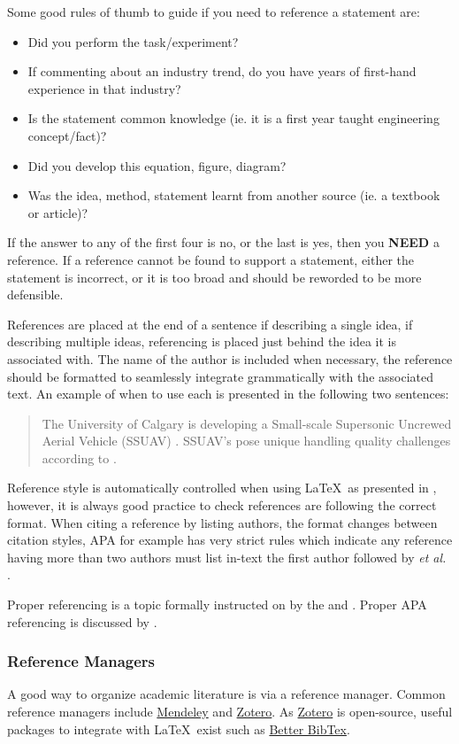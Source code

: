 \noindent
Some good rules of thumb to guide if you need to reference a statement are: 
\begin{itemize}
	\item Did you perform the task/experiment?
	\item If commenting about an industry trend, do you have years of first-hand experience in that industry?
	\item Is the statement common knowledge (ie. it is a first year taught engineering concept/fact)?
	\item Did you develop this equation, figure, diagram? 
	\item Was the idea, method, statement learnt from another source (ie. a textbook or article)?
\end{itemize}
\noindent
If the answer to any of the first four is no, or the last is yes, then you \textbf{NEED} a reference. 
If a reference cannot be found to support a statement, either the statement is incorrect, or it is too broad and should be reworded to be more defensible. 

References are placed at the end of a sentence if describing a single idea, if describing multiple ideas, referencing is placed just behind the idea it is associated with. The name of the author is included when necessary, the reference should be formatted to seamlessly integrate grammatically with the associated text. 
An example of when to use each is presented in the following two sentences:

\begin{quotation}
	\noindent 
	The University of Calgary is developing a Small-scale Supersonic Uncrewed Aerial Vehicle (SSUAV) \cite{BenConference}. SSUAV's pose unique handling quality challenges according to \citeauthor{BenConference} \cite{BenConference}.
\end{quotation}


\noindent 
Reference style is automatically controlled when using \LaTeX\ as presented in , however, it is always good practice to check references are following the correct format. When citing a reference by listing authors, the format changes between citation styles, APA for example has very strict rules which indicate any reference having more than two authors must list in-text the first author followed by \textit{et al.} \cite{apa}.

Proper referencing is a topic formally instructed on by the \citeauthor{writingUofC} \cite{writingUofC} and \citeauthor{writingCoursesUofC} \cite{writingCoursesUofC}. 
Proper APA referencing is discussed by \citeauthor{apa} \cite{apa}. 

\subsubsection{Reference Managers}
A good way to organize academic literature is via a reference manager. 
Common reference managers include \href{https://www.mendeley.com/}{Mendeley} and \href{https://www.zotero.org/}{Zotero}. 
As \href{https://www.zotero.org/}{Zotero} is open-source, useful packages to integrate with \LaTeX\ exist such as \href{https://retorque.re/zotero-better-bibtex/}{Better BibTex}. 